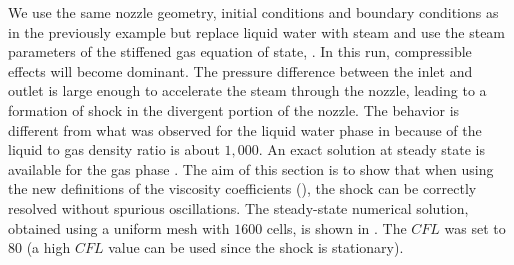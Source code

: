 We use the same nozzle geometry, initial conditions and boundary conditions as in the previously example but replace liquid water with steam and use the steam parameters of the stiffened gas equation of state, . In this run, compressible effects will become dominant. 
The pressure difference between the inlet and outlet is large enough to accelerate the steam through the nozzle, leading to a formation of shock in the divergent portion of the nozzle. The behavior is different from what was observed for the liquid water phase in  because of the liquid to gas density ratio is about $1,000$. An exact solution at steady state is available for the gas phase \cite{nozzle_exact}. The aim of this section is to show that when using the new definitions of the viscosity coefficients (), the shock can be correctly resolved without spurious oscillations. The steady-state numerical solution, obtained using a uniform mesh with $1600$ cells, is shown in . The $CFL$ was set to $80$ (a high $CFL$ value can be used since the shock is stationary).


